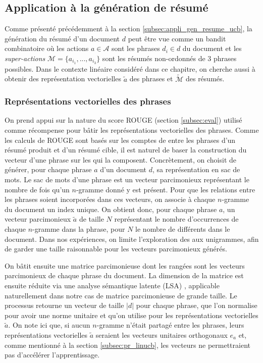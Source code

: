 \subsection{Application à la génération de résumé}
\label{subsec:representations_phrases}

Comme présenté précédemment à la section \ref{subsec:appli_gen_resume_ucb}, 
la génération du résumé d'un document $d$ peut être vue comme un bandit combinatoire 
où les actions $a \in \mathcal{A}$ sont les phrases $d_i \in d$ du document
et les \textit{super-actions} $\mathcal{M}=\{a_{i_1},...,a_{i_3}\}$ sont 
les résumés non-ordonnés de 3 phrases possibles.
Dans le contexte linéaire considéré dans ce chapitre, on cherche aussi 
à obtenir des représentation vectorielles $\tilde{a}$ des phrases 
et $\tilde{\mathcal{M}}$ des résumés.


\subsubsection*{Représentations vectorielles des phrases}

On prend appui sur la nature du score ROUGE (section \ref{subsec:eval}) 
utilisé comme récompense pour bâtir les représentations vectorielles des phrases.
Comme les calculs de ROUGE sont basés sur les comptes 
de \ngrams entre les phrases d'un résumé produit et d'un résumé
cible, il est naturel de baser la construction du vecteur 
d'une phrase sur les \ngrams qui la composent.
Concrètement, on choisit de générer, pour chaque phrase $a$ d'un document $d$,
sa représentation en sac de mots. 
Le sac de mots d'une phrase est un vecteur parcimonieux représentant 
le nombre de fois qu'un $n$-gramme donné y est présent.
Pour que les relations entre les phrases soient incorporées dans ces vecteurs,
on associe à chaque $n$-gramme du document un index unique.
On obtient donc, pour chaque phrase $a$, un vecteur parcimonieux $\tilde{a}$
de taille $N$ représentant le 
nombre d'occurrences de chaque $n$-gramme dans la phrase, pour $N$  le nombre de \ngrams 
différents dans le document.
Dans nos expériences, on limite l'exploration des \ngrams aux unigrammes,
afin de garder une taille raisonnable pour les vecteurs parcimonieux générés.

On bâtit ensuite une matrice parcimonieuse dont les rangées sont les vecteurs parcimonieux 
de chaque phrase du document.
La dimension de la matrice est ensuite réduite via une analyse sémantique latente (LSA) \citep{10.1145/291128.291131}, 
applicable naturellement dans notre cas de matrice parcimonieuse de grande taille.
Le processus retourne un vecteur de taille $|d|$ pour chaque phrase, que l'on normalise pour avoir 
une norme unitaire et qu'on utilise pour les 
représentations vectorielles $\tilde{a}$.
On note ici que, si aucun $n$-gramme n'était partagé entre les phrases,
leurs représentations vectorielles $\tilde{a}$ seraient
les vecteurs unitaires orthogonaux $e_a$ et, 
comme mentionné à la section \ref{subsec:pr_linucb}, les vecteurs
ne permettraient pas d'accélérer l'apprentissage.

